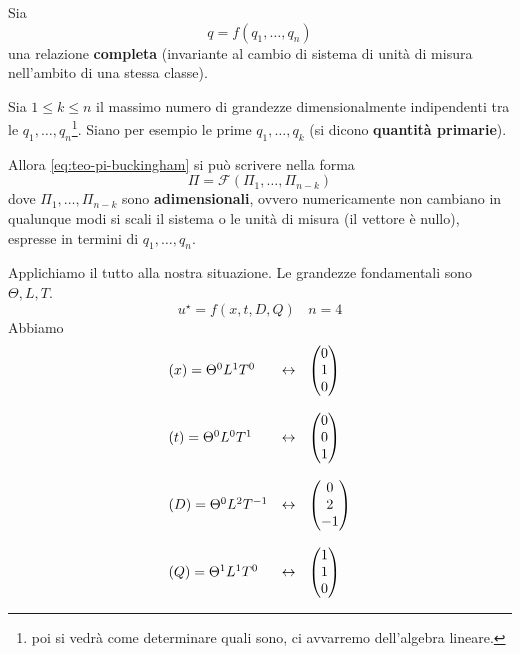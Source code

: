 \documentclass[10pt,a4paper,twoside,openright]{book}
\begin{document}
\begin{theorem}
[Pi di Buckingham] Sia
\begin{equation}
q=f(q_{1},\dotsc,q_{n}) \tag{R}
\label{eq:teo-pi-buckingham}
\end{equation}
una relazione \textbf{completa} (invariante al cambio di sistema di unità di misura nell'ambito di una stessa classe).

Sia $1\leqslant k\leqslant n$ il massimo numero di grandezze dimensionalmente indipendenti tra le $q_{1},\dotsc,q_{n}$\footnote{poi si vedrà come determinare quali sono, ci avvarremo dell'algebra lineare.}. Siano per esempio le prime $q_{1},\dotsc,q_{k}$ (si dicono \textbf{quantità primarie}).

Allora \eqref{eq:teo-pi-buckingham} si può scrivere nella forma
\begin{equation*}
\Pi =\mathcal{F}(\Pi _{1},\dotsc,\Pi _{n-k})
\end{equation*}
dove $\Pi _{1},\dotsc,\Pi _{n-k}$ sono \textbf{adimensionali}, ovvero numericamente non cambiano in qualunque modi si scali il sistema o le unità di misura (il vettore è nullo), espresse in termini di $q_{1},\dotsc,q_{n}$.
\end{theorem}
Applichiamo il tutto alla nostra situazione. Le grandezze fondamentali sono $\Theta,L,T$.
\begin{equation*}
u^{\star } =f(x,t,D,Q) \ \ \ \ n=4
\end{equation*}
Abbiamo
\begin{equation*}
\begin{array}{ l l }
(x) =\Theta ^{0} L^{1} T^{0} & \leftrightarrow \ \ \begin{pmatrix}
0\\
1\\
0
\end{pmatrix}\\\\
(t) =\Theta ^{0} L^{0} T^{1} & \leftrightarrow \ \ \begin{pmatrix}
0\\
0\\
1
\end{pmatrix}\\\\
(D) =\Theta ^{0} L^{2} T^{-1} & \leftrightarrow \ \ \begin{pmatrix}
0\\
2\\
-1
\end{pmatrix}\\\\
(Q) =\Theta ^{1} L^{1} T^{0} & \leftrightarrow \ \ \begin{pmatrix}
1\\
1\\
0
\end{pmatrix}
\end{array}
\end{equation*}
\end{document}
